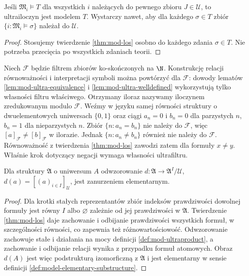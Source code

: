 \begin{wniosek}
\label{cor:mod-ultra-theory}
Jeśli $\mathfrak M_i\models T$ dla wszystkich $i$ należących
do pewnego zbioru $J\in\mathcal U$, to ultrailoczyn jest modelem $T$.
Wystarczy nawet, aby dla każdego $\sigma\in T$ zbiór
$\{i:\mathfrak M_i\models\sigma\}$ należał do $\mathcal U$.
\end{wniosek}
\begin{proof}
Stosujemy twierdzenie \ref{thm:mod-los} osobno do każdego zdania
$\sigma\in T$. Nie potrzeba przecięcia po wszystkich zdaniach teorii.
\end{proof}

\begin{przyklad}
\label{ex:mod-reduced-product-negation}
Niech $\mathcal F$ będzie filtrem zbiorów ko-skończonych na $\N$.
Konstrukcję relacji równoważności i interpretacji symboli można
powtórzyć dla $\mathcal F$: dowody lematów
\ref{lem:mod-ultra-equivalence} i \ref{lem:mod-ultra-welldefined}
wykorzystują tylko własności filtru właściwego. Otrzymany iloraz
nazywamy iloczynem zredukowanym modulo $\mathcal F$.
Weźmy w języku samej równości struktury o dwuelementowych
uniwersach $\{0,1\}$ oraz ciągi $a_n=0$ i
$b_n=0$ dla parzystych $n$, $b_n=1$ dla nieparzystych $n$.
Zbiór $\{n:a_n=b_n\}$ nie należy do $\mathcal F$, więc
$[a]_{\mathcal F}\ne[b]_{\mathcal F}$ w ilorazie.
Jednak $\{n:a_n\ne b_n\}$ również nie należy do $\mathcal F$.
Równoważność z twierdzenia \ref{thm:mod-los} zawodzi zatem
dla formuły $x\ne y$. Właśnie krok dotyczący negacji wymaga
własności ultrafiltru.
\end{przyklad}

\begin{wniosek}
\label{cor:mod-ultrapower-diagonal}
Dla struktury $\mathfrak A$ o uniwersum $A$ odwzorowanie
$d:\mathfrak A\to\mathfrak A^I/\mathcal U$,
$d(a)=[(a)_{i\in I}]_{\mathcal U}$, jest zanurzeniem elementarnym.
\end{wniosek}
\begin{proof}
Dla krotki stałych reprezentantów zbiór indeksów prawdziwości
dowolnej formuły jest równy $I$ albo $\varnothing$ zależnie
od jej prawdziwości w $\mathfrak A$. Twierdzenie \ref{thm:mod-los}
daje zachowanie i odbijanie prawdziwości wszystkich formuł,
w szczególności równości, co zapewnia też różnowartościowość.
Odwzorowanie zachowuje stałe i działania na mocy definicji
\ref{def:mod-ultraproduct}, a zachowanie i odbijanie relacji
wynika z przypadku formuł atomowych. Obraz $d(A)$ jest więc
podstrukturą izomorficzną z $\mathfrak A$ i jest elementarny
w sensie definicji \ref{def:model-elementary-substructure}.
\end{proof}

